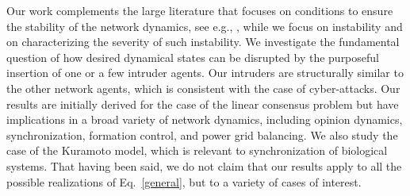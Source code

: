 \documentclass[%
 reprint,
 amsmath,amssymb,
 aip,
]{revtex4-2}
\theoremstyle{italichead}
\theoremstyle{definition}
\begin{document}
{ Our work complements the large literature that focuses on conditions to ensure the stability of the network dynamics, see e.g., \cite{boccaletti2006complex}, while we focus on instability and on characterizing the severity of such instability. We investigate the fundamental question of how desired dynamical states can be disrupted by the purposeful insertion of one or a few intruder agents. 
Our intruders are structurally similar to the other network agents, which is consistent with the case of cyber-attacks. 
Our results are initially derived for the case of the linear consensus problem but have implications in a broad variety of network dynamics, including opinion dynamics, synchronization, formation control, and power grid balancing. We also study the case of the Kuramoto model, %
which is relevant to synchronization of biological systems. That having been said, we do not claim that our results apply to all the possible realizations of Eq.\ \eqref{general}, but to a variety of cases of interest.

}
\end{document}
